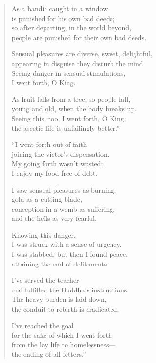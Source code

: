 \documentclass[12pt,openany]{book}%
\begin{document}
\begin{verse}
As a bandit caught in a window \\
is punished for his own bad deeds; \\
so after departing, in the world beyond, \\
people are punished for their own bad deeds. 

Sensual pleasures are diverse, sweet, delightful, \\
appearing in disguise they disturb the mind. \\
Seeing danger in sensual stimulations, \\
I went forth, O King. 

As fruit falls from a tree, so people fall, \\
young and old, when the body breaks up. \\
Seeing this, too, I went forth, O King; \\
the ascetic life is unfailingly better.” 

“I went forth out of faith \\
joining the victor’s dispensation. \\
My going forth wasn’t wasted; \\
I enjoy my food free of debt. 

I saw sensual pleasures as burning, \\
gold as a cutting blade, \\
conception in a womb as suffering, \\
and the hells as very fearful. 

Knowing this danger, \\
I was struck with a sense of urgency. \\
I was stabbed, but then I found peace, \\
attaining the end of defilements. 

I’ve served the teacher \\
and fulfilled the Buddha’s instructions. \\
The heavy burden is laid down, \\
the conduit to rebirth is eradicated. 

I’ve reached the goal \\
for the sake of which I went forth \\
from the lay life to homelessness—\\
the ending of all fetters.” 

%
\end{verse}
\end{document}
